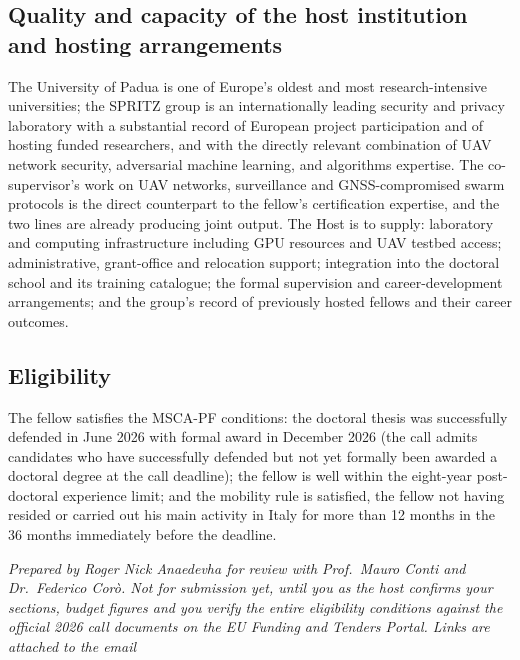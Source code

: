 \documentclass[11pt,a4paper]{article}
\begin{document}
\subsection{Quality and capacity of the host institution and hosting arrangements}
The University of Padua is one of Europe's oldest and most research-intensive universities; the SPRITZ group is an internationally leading security and privacy laboratory with a substantial record of European project participation and of hosting funded researchers, and with the directly relevant combination of UAV network security, adversarial machine learning, and algorithms expertise. The co-supervisor's work on UAV networks, surveillance and GNSS-compromised swarm protocols is the direct counterpart to the fellow's certification expertise, and the two lines are already producing joint output.
The Host is to supply: laboratory and computing infrastructure including GPU resources and UAV testbed access; administrative, grant-office and relocation support; integration into the doctoral school and its training catalogue; the formal supervision and career-development arrangements; and the group's record of previously hosted fellows and their career outcomes.

\subsection{Eligibility}
The fellow satisfies the MSCA-PF conditions: the doctoral thesis was successfully defended in June 2026 with formal award in December 2026 (the call admits candidates who have successfully defended but not yet formally been awarded a doctoral degree at the call deadline); the fellow is well within the eight-year post-doctoral experience limit; and the mobility rule is satisfied, the fellow not having resided or carried out his main activity in Italy for more than 12 months in the 36 months immediately before the deadline. 

\vspace{0.4em}
{\footnotesize\itshape Prepared by Roger Nick Anaedevha for review with Prof.\ Mauro Conti and Dr.\ Federico Cor\`o. Not for submission yet, until you as the host confirms your sections, budget figures and you verify the entire eligibility conditions against the official 2026 call documents on the EU Funding and Tenders Portal. Links are attached to the email}
\end{document}
